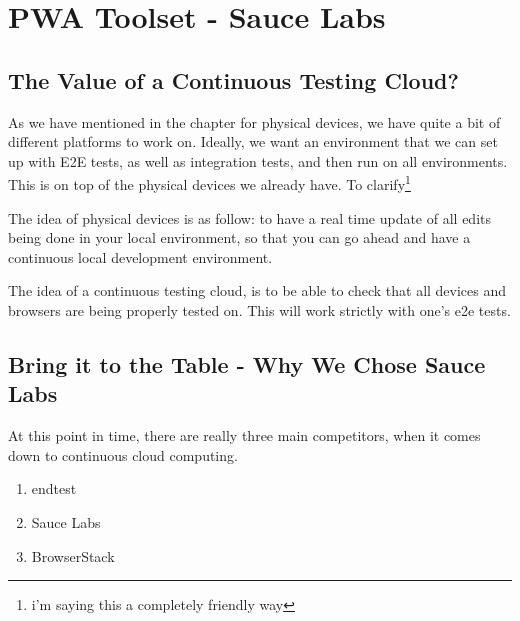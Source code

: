 \maketitle{}
\section{ PWA Toolset - Sauce Labs }

\subsection{ The Value of a Continuous Testing Cloud? }

As we have mentioned in the chapter for physical devices, we have quite a bit of
different platforms to work on. Ideally, we want an environment that we can set
up with E2E tests, as well as integration tests, and then run on all environments.
This is on top of the physical devices we already have. To clarify\footnote{i'm saying this a completely friendly way}

The idea of physical devices is as follow: to have a real time update of all
edits being done in your local environment, so that you can go ahead and have a
continuous local development environment.

The idea of a continuous testing cloud, is to be able to check that all devices
and browsers are being properly tested on. This will work strictly with one's
e2e tests.

\subsection{ Bring it to the Table - Why We Chose Sauce Labs }

At this point in time, there are really three main competitors, when it comes
down to continuous cloud computing.

\begin{enumerate}
  \item endtest
  \item Sauce Labs
  \item BrowserStack
\end{enumerate}
